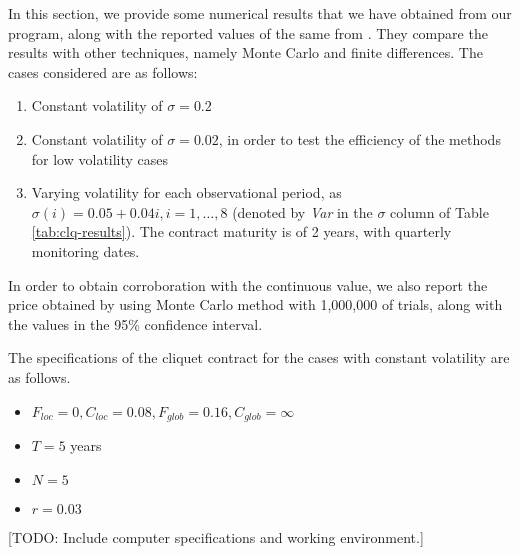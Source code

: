 In this section, we provide some numerical results that we have obtained from our program, along with the reported values of the same from \cite[Section 4]{Gaudenzi2011}. They compare the results with other techniques, namely Monte Carlo and finite differences. The cases considered are as follows:
\begin{enumerate}
	\item Constant volatility of $ \sigma = 0.2 $
	\item Constant volatility of $ \sigma = 0.02 $, in order to test the efficiency of the methods for low volatility cases
	\item Varying volatility for each observational period, as $ \sigma(i) = 0.05 + 0.04i, i = 1, \dots, 8 $ (denoted by \emph{Var} in the $ \sigma $ column of Table \ref{tab:clq-results}). The contract maturity is of 2 years, with quarterly monitoring dates.
\end{enumerate}
In order to obtain corroboration with the continuous value, we also report the price obtained by using Monte Carlo method with 1,000,000 of trials, along with the values in the 95\% confidence interval.

The specifications of the cliquet contract for the cases with constant volatility are as follows.
\begin{itemize}
	\item $ F_{loc} = 0, C_{loc} = 0.08, F_{glob} = 0.16, C_{glob} = \infty $
	\item $ T = 5 $ years
	\item $ N = 5 $
	\item $ r = 0.03 $
\end{itemize}

[TODO: Include computer specifications and working environment.]

